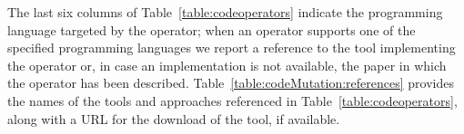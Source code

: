 The last six columns of Table~\ref{table:codeoperators} indicate the programming language targeted by the operator; when an operator supports one of the specified programming languages we report a reference to the tool implementing the operator or, in case an implementation is not available, the paper in which the operator has been described. 
Table~\ref{table:codeMutation:references} provides the names of the tools and approaches referenced in Table~\ref{table:codeoperators}, along with a URL for the download of the tool, if available.





